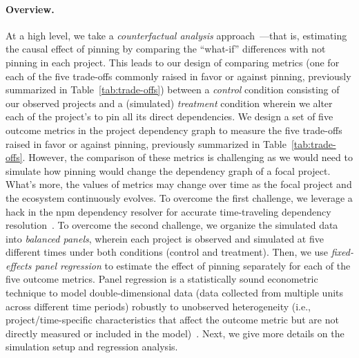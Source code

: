 \paragraph{Overview.}
At a high level, we take a \emph{counterfactual analysis} approach~\cite{morgan2015counterfactuals}---that is, estimating the causal effect of pinning by comparing the ``what-if'' differences with not pinning in each project.
This leads to our design of comparing metrics (one for each of the five trade-offs commonly raised in favor or against pinning, previously summarized in Table~\ref{tab:trade-offs}) 
between a \emph{control} condition consisting of our observed projects and a (simulated) \emph{treatment} condition wherein we alter each of the project's  to pin all its direct dependencies.
We design a set of five outcome metrics in the project dependency graph to measure the five trade-offs raised in favor or against pinning, previously summarized in Table~\ref{tab:trade-offs}.
However, the comparison of these metrics is challenging as we would need to simulate how pinning would change the dependency graph of a focal project.
What's more, the values of metrics may change over time as the focal project and the ecosystem continuously evolves.
To overcome the first challenge, we leverage a hack in the npm dependency resolver for accurate time-traveling dependency resolution~\cite{DBLP:conf/msr/PinckneyCGB23}.
To overcome the second challenge, we organize the simulated data into \textit{balanced panels}, wherein each project is observed and simulated at five different times under both conditions (control and treatment). 
Then, we use \emph{fixed-effects panel regression} to estimate the effect of pinning 
separately for each of the five outcome metrics. 
Panel regression is a statistically sound econometric technique to model double-dimensional data (data collected from multiple units across different time periods) robustly to unobserved heterogeneity (i.e., project/time-specific characteristics that affect the outcome metric but are not directly measured or included in the model)~\cite{bruderl2015fixed, hanck2021introduction}.
Next, we give more details on the simulation setup and regression analysis.

